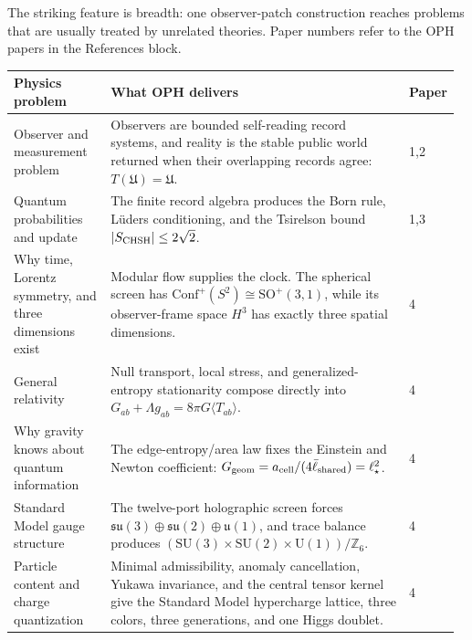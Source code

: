 \documentclass[10pt]{article}
\renewcommand{\arraystretch}{1.15}
\newcommand{\sect}[1]{\vspace{0.36em}{\large\bfseries\color{pragmaCyanText}#1}\par\vspace{-0.04em}}
\begin{document}
\sect{5. Landmark solution map}
The striking feature is breadth: one observer-patch construction reaches
problems that are usually treated by unrelated theories. Paper numbers refer
to the OPH papers in the References block.
\begin{center}
\fontsize{7.35pt}{8.0pt}\selectfont
\setlength{\tabcolsep}{2.8pt}
\renewcommand{\arraystretch}{1.02}
\begin{longtable}{@{}L{0.22\linewidth}L{0.69\linewidth}L{0.06\linewidth}@{}}
\toprule
{}
\textbf{Physics problem} & \textbf{What OPH delivers} & \textbf{Paper}\\
\midrule
\endhead
Observer and measurement problem &
Observers are bounded self-reading record systems, and reality is the stable
public world returned when their overlapping records agree:
\(T(\mathfrak U)=\mathfrak U\). & 1,2\\

Quantum probabilities and update &
The finite record algebra produces the Born rule, L\"uders conditioning, and
the Tsirelson bound \(|S_{\rm CHSH}|\le2\sqrt2\). & 1,3\\

Why time, Lorentz symmetry, and three dimensions exist &
Modular flow supplies the clock. The spherical screen has
\(\mathrm{Conf}^+(S^2)\cong\mathrm{SO}^+(3,1)\), while its observer-frame
space \(H^3\) has exactly three spatial dimensions. & 4\\

General relativity &
Null transport, local stress, and generalized-entropy stationarity compose
directly into
\(G_{ab}+\Lambda g_{ab}=8\pi G\langle T_{ab}\rangle\). & 4\\

Why gravity knows about quantum information &
The edge-entropy/area law fixes the Einstein and Newton coefficient:
\(G_{\rm geom}=a_{\rm cell}/(4\bar\ell_{\rm shared})=\ell_\star^2\). & 4\\

Standard Model gauge structure &
The twelve-port holographic screen forces
\(\mathfrak{su}(3)\oplus\mathfrak{su}(2)\oplus\mathfrak u(1)\), and trace
balance produces
\((\mathrm{SU}(3)\times\mathrm{SU}(2)\times\mathrm{U}(1))/\mathbb Z_6\). & 4\\

Particle content and charge quantization &
Minimal admissibility, anomaly cancellation, Yukawa invariance, and the
central tensor kernel give the Standard Model hypercharge lattice, three
colors, three generations, and one Higgs doublet. & 4\\


\end{longtable}
\end{center}
\end{document}
